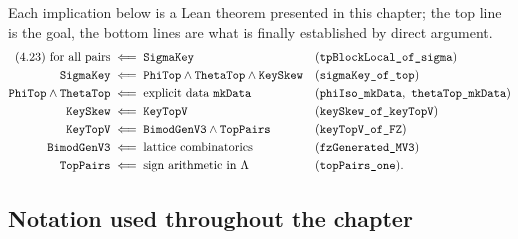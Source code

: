 \begin{remark}\label{ch14:rem:chain}
Each implication below is a Lean theorem presented in this chapter; the top line is the goal, the
bottom lines are what is finally established by direct argument.
\begin{align*}
  \text{(4.23) for all pairs}
  &\;\Longleftarrow\; \lean{SigmaKey}
   && (\lean{tpBlockLocal_of_sigma})\\
  \lean{SigmaKey}
  &\;\Longleftarrow\; \lean{PhiTop}\wedge\lean{ThetaTop}\wedge\lean{KeySkew}
   && (\lean{sigmaKey_of_top})\\
  \lean{PhiTop}\wedge\lean{ThetaTop}
  &\;\Longleftarrow\; \text{explicit data }\lean{mkData}
   && (\lean{phiIso_mkData},\ \lean{thetaTop_mkData})\\
  \lean{KeySkew}
  &\;\Longleftarrow\; \lean{KeyTopV}
   && (\lean{keySkew_of_keyTopV})\\
  \lean{KeyTopV}
  &\;\Longleftarrow\; \lean{BimodGenV3}\wedge\lean{TopPairs}
   && (\lean{keyTopV_of_FZ})\\
  \lean{BimodGenV3}
  &\;\Longleftarrow\; \text{lattice combinatorics}
   && (\lean{fzGenerated_MV3})\\
  \lean{TopPairs}
  &\;\Longleftarrow\; \text{sign arithmetic in }\Leech
   && (\lean{topPairs_one}).
\end{align*}
\end{remark}

\subsection{Notation used throughout the chapter}\label{ch14:sec:notation}

